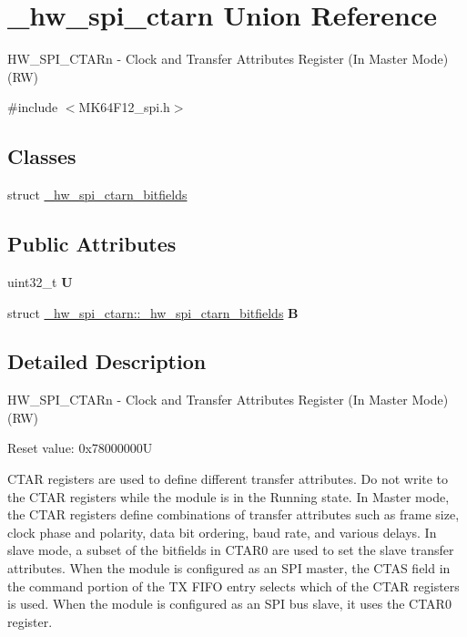 \hypertarget{union__hw__spi__ctarn}{}\section{\+\_\+hw\+\_\+spi\+\_\+ctarn Union Reference}
\label{union__hw__spi__ctarn}


H\+W\+\_\+\+S\+P\+I\+\_\+\+C\+T\+A\+Rn -\/ Clock and Transfer Attributes Register (In Master Mode) (RW)  




{\ttfamily \#include $<$M\+K64\+F12\+\_\+spi.\+h$>$}

\subsection*{Classes}
\begin{DoxyCompactItemize}
\item 
struct \hyperlink{struct__hw__spi__ctarn_1_1__hw__spi__ctarn__bitfields}{\+\_\+hw\+\_\+spi\+\_\+ctarn\+\_\+bitfields}
\end{DoxyCompactItemize}
\subsection*{Public Attributes}
\begin{DoxyCompactItemize}
\item 
uint32\+\_\+t {\bfseries U}\hypertarget{union__hw__spi__ctarn_a991a48c225b41f3289462d6dafa77bb0}{}\label{union__hw__spi__ctarn_a991a48c225b41f3289462d6dafa77bb0}

\item 
struct \hyperlink{struct__hw__spi__ctarn_1_1__hw__spi__ctarn__bitfields}{\+\_\+hw\+\_\+spi\+\_\+ctarn\+::\+\_\+hw\+\_\+spi\+\_\+ctarn\+\_\+bitfields} {\bfseries B}\hypertarget{union__hw__spi__ctarn_abe49cc78105083caf81e3e562da737db}{}\label{union__hw__spi__ctarn_abe49cc78105083caf81e3e562da737db}

\end{DoxyCompactItemize}


\subsection{Detailed Description}
H\+W\+\_\+\+S\+P\+I\+\_\+\+C\+T\+A\+Rn -\/ Clock and Transfer Attributes Register (In Master Mode) (RW) 

Reset value\+: 0x78000000U

C\+T\+AR registers are used to define different transfer attributes. Do not write to the C\+T\+AR registers while the module is in the Running state. In Master mode, the C\+T\+AR registers define combinations of transfer attributes such as frame size, clock phase and polarity, data bit ordering, baud rate, and various delays. In slave mode, a subset of the bitfields in C\+T\+A\+R0 are used to set the slave transfer attributes. When the module is configured as an S\+PI master, the C\+T\+AS field in the command portion of the TX F\+I\+FO entry selects which of the C\+T\+AR registers is used. When the module is configured as an S\+PI bus slave, it uses the C\+T\+A\+R0 register. 

